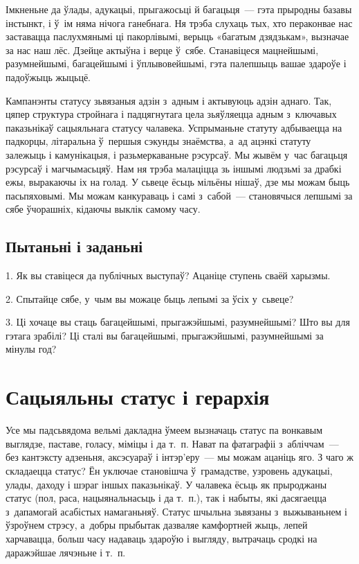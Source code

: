 Імкненьне да ўлады, адукацыі, прыгажосьці й багацьця~--- гэта прыродны базавы інстынкт, і ў~ім няма нічога ганебнага. Ня трэба слухаць тых, хто пераконвае нас заставацца паслухмянымі ці пакорлівымі, верыць «багатым дзядзькам», вызначае за нас наш лёс. Дзейце актыўна і верце ў~сябе. Станавіцеся мацнейшымі, разумнейшымі, багацейшымі і ўплывовейшымі, гэта палепшыць вашае здароўе і падоўжыць жыцьцё.

Кампанэнты статусу зьвязаныя адзін з~адным і актывуюць адзін аднаго. Так, цяпер структура стройнага і падцягнутага цела зьяўляецца адным з~ключавых паказьнікаў сацыяльнага статусу чалавека. Успрыманьне статуту адбываецца на падкорцы, літаральна ў~першыя сэкунды знаёмства, а~ад ацэнкі статуту залежыць і камунікацыя, і разьмеркаваньне рэсурсаў. Мы жывём у~час багацьця рэсурсаў і магчымасьцяў. Нам ня трэба малаціцца зь іншымі людзьмі за драбкі ежы, выракаючы іх на голад. У сьвеце ёсьць мільёны нішаў, дзе мы можам быць пасьпяховымі. Мы можам канкураваць і самі з~сабой~--- становячыся лепшымі за сябе ўчорашніх, кідаючы выклік самому часу.

\subsection*{Пытаньні і заданьні}

1. Як вы ставіцеся да публічных выступаў? Ацаніце ступень сваёй харызмы.

2. Спытайце сябе, у~чым вы можаце быць лепымі за ўсіх у~сьвеце?

3. Ці хочаце вы стаць багацейшымі, прыгажэйшымі, разумнейшымі? Што вы для гэтага зрабілі? Ці сталі вы багацейшымі, прыгажэйшымі, разумнейшымі за мінулы год?


\section{Сацыяльны статус і герархія}

Усе мы падсьвядома вельмі дакладна ўмеем вызначаць статус па вонкавым выглядзе, паставе, голасу, міміцы і да т.~п. Нават па фатаграфіі з~абліччам~--- без кантэксту адзеньня, аксэсуараў і інтэр'еру~--- мы можам ацаніць яго. З чаго ж складаецца статус? Ён уключае становішча ў~грамадстве, узровень адукацыі, улады, даходу і шэраг іншых паказьнікаў. У чалавека ёсьць як прыроджаны статус (пол, раса, нацыянальнасьць і да т.~п.), так і набыты, які дасягаецца з~дапамогай асабістых намаганьняў. Статус шчыльна зьвязаны з~выжываньнем і ўзроўнем стрэсу, а~добры прыбытак дазваляе камфортней жыць, лепей харчавацца, больш часу надаваць здароўю і выгляду, вытрачаць сродкі на даражэйшае лячэньне і т.~п.

